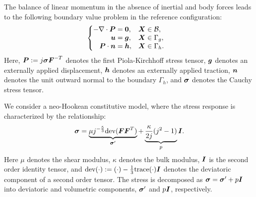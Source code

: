 The balance of linear momentum in the absence of inertial and body forces
leads to the following boundary value problem in the reference configuration:
%
\begin{gather}
\begin{cases}
\begin{aligned}
- \nabla \cdot \boldsymbol{P} &= \boldsymbol{0}, && \boldsymbol{X} \in \mathcal{B}, \\
\boldsymbol{u} &= \boldsymbol{g}, && \boldsymbol{X} \in \Gamma_g, \\
\boldsymbol{P} \cdot \boldsymbol{n} &= \boldsymbol{h}, && \boldsymbol{X} \in \Gamma_h.
\end{aligned}
\end{cases}
\label{eq:mech_linear_momentum}
\end{gather}
%
Here, $\boldsymbol{P} := j \boldsymbol{\sigma} \boldsymbol{F}^{-T}$ denotes the first Piola-Kirchhoff
stress tensor, $\boldsymbol{g}$ denotes an externally applied displacement, $\boldsymbol{h}$
denotes an externally applied traction, $\boldsymbol{n}$ denotes the unit outward
normal to the boundary $\Gamma_h$, and $\boldsymbol{\sigma}$ denotes the Cauchy
stress tensor.

We consider a neo-Hookean constitutive model, where the stress response
is characterized by the relationship:
%
\begin{gather}
\boldsymbol{\sigma} =
\underbrace{\mu j^{-\frac53} \text{dev}(\boldsymbol{F}\boldsymbol{F}^T)}_{\boldsymbol{\sigma}'} +
\underbrace{\frac{\kappa}{2 j}(j^2 - 1)}_{p} \boldsymbol{I}.
\label{eq:mech_neohookean_model}
\end{gather}
%
Here $\mu$ denotes the shear modulus, $\kappa$ denotes the bulk modulus,
$\boldsymbol{I}$ is the second order identity tensor, and $\text{dev}(\cdot) :=
(\cdot) - \frac13 \text{trace}(\cdot) \boldsymbol{I}$ denotes the deviatoric component
of a second order tensor. The stress is decomposed as $\boldsymbol{\sigma} =
\boldsymbol{\sigma}' + p \boldsymbol{I}$ into deviatoric and volumetric components,
$\boldsymbol{\sigma}'$ and $p \boldsymbol{I}$, respectively.

